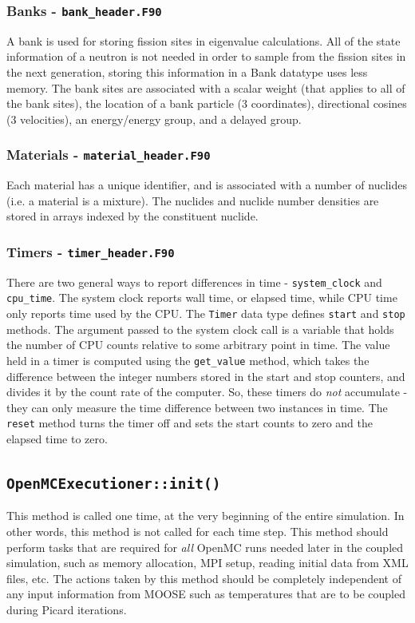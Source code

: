 \documentclass[10pt]{article}
\numberwithin{equation}{section} %
\begin{document}
\subsubsection{Banks - {\tt bank\_header.F90}}
A bank is used for storing fission sites in eigenvalue calculations. All of the state information of a neutron is not needed in order to sample from the fission sites in the next generation, storing this information in a Bank datatype uses less memory. The bank sites are associated with a scalar weight (that applies to all of the bank sites), the location of a bank particle (3 coordinates), directional cosines (3 velocities), an energy/energy group, and a delayed group. 

\subsubsection{Materials - {\tt material\_header.F90}}
Each material has a unique identifier, and is associated with a number of nuclides (i.e. a material is a mixture). The nuclides and nuclide number densities are stored in arrays indexed by the constituent nuclide. 

\subsubsection{Timers - {\tt timer\_header.F90}}
There are two general ways to report differences in time - {\tt system\_clock} and {\tt cpu\_time}. The system clock reports wall time, or elapsed time, while CPU time only reports time used by the CPU. The {\tt Timer} data type defines {\tt start} and {\tt stop} methods. The argument passed to the system clock call is a variable that holds the number of CPU counts relative to some arbitrary point in time. The value held in a timer is computed using the {\tt get\_value} method, which takes the difference between the integer numbers stored in the start and stop counters, and divides it by the count rate of the computer. So, these timers do {\it not} accumulate - they can only measure the time difference between two instances in time. The {\tt reset} method turns the timer off and sets the start counts to zero and the elapsed time to zero.

\subsection{\tt OpenMCExecutioner::init()}
This method is called one time, at the very beginning of the entire simulation. In other words, this method is not called for each time step. This method should perform tasks that are required for {\it all} OpenMC runs needed later in the coupled simulation, such as memory allocation, MPI setup, reading initial data from XML files, etc. The actions taken by this method should be completely independent of any input information from MOOSE such as temperatures that are to be coupled during Picard iterations. 
\end{document}

